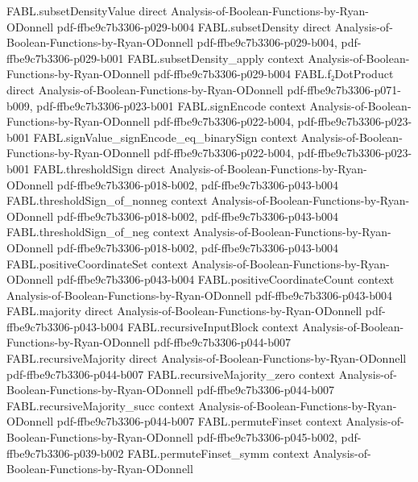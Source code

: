 \begin{theorem}
\proofstep
  {FABL.subsetDensityValue}
  {direct}
  {Analysis-of-Boolean-Functions-by-Ryan-ODonnell}
  {pdf-ffbe9c7b3306-p029-b004}
\proofstep
  {FABL.subsetDensity}
  {direct}
  {Analysis-of-Boolean-Functions-by-Ryan-ODonnell}
  {pdf-ffbe9c7b3306-p029-b004,
    pdf-ffbe9c7b3306-p029-b001}
\proofstep
  {FABL.subsetDensity_apply}
  {context}
  {Analysis-of-Boolean-Functions-by-Ryan-ODonnell}
  {pdf-ffbe9c7b3306-p029-b004}
\proofstep
  {FABL.f₂DotProduct}
  {direct}
  {Analysis-of-Boolean-Functions-by-Ryan-ODonnell}
  {pdf-ffbe9c7b3306-p071-b009,
    pdf-ffbe9c7b3306-p023-b001}
\proofstep
  {FABL.signEncode}
  {context}
  {Analysis-of-Boolean-Functions-by-Ryan-ODonnell}
  {pdf-ffbe9c7b3306-p022-b004,
    pdf-ffbe9c7b3306-p023-b001}
\proofstep
  {FABL.signValue_signEncode_eq_binarySign}
  {context}
  {Analysis-of-Boolean-Functions-by-Ryan-ODonnell}
  {pdf-ffbe9c7b3306-p022-b004,
    pdf-ffbe9c7b3306-p023-b001}
\proofstep
  {FABL.thresholdSign}
  {direct}
  {Analysis-of-Boolean-Functions-by-Ryan-ODonnell}
  {pdf-ffbe9c7b3306-p018-b002,
    pdf-ffbe9c7b3306-p043-b004}
\proofstep
  {FABL.thresholdSign_of_nonneg}
  {context}
  {Analysis-of-Boolean-Functions-by-Ryan-ODonnell}
  {pdf-ffbe9c7b3306-p018-b002,
    pdf-ffbe9c7b3306-p043-b004}
\proofstep
  {FABL.thresholdSign_of_neg}
  {context}
  {Analysis-of-Boolean-Functions-by-Ryan-ODonnell}
  {pdf-ffbe9c7b3306-p018-b002,
    pdf-ffbe9c7b3306-p043-b004}
\proofstep
  {FABL.positiveCoordinateSet}
  {context}
  {Analysis-of-Boolean-Functions-by-Ryan-ODonnell}
  {pdf-ffbe9c7b3306-p043-b004}
\proofstep
  {FABL.positiveCoordinateCount}
  {context}
  {Analysis-of-Boolean-Functions-by-Ryan-ODonnell}
  {pdf-ffbe9c7b3306-p043-b004}
\proofstep
  {FABL.majority}
  {direct}
  {Analysis-of-Boolean-Functions-by-Ryan-ODonnell}
  {pdf-ffbe9c7b3306-p043-b004}
\proofstep
  {FABL.recursiveInputBlock}
  {context}
  {Analysis-of-Boolean-Functions-by-Ryan-ODonnell}
  {pdf-ffbe9c7b3306-p044-b007}
\proofstep
  {FABL.recursiveMajority}
  {direct}
  {Analysis-of-Boolean-Functions-by-Ryan-ODonnell}
  {pdf-ffbe9c7b3306-p044-b007}
\proofstep
  {FABL.recursiveMajority_zero}
  {context}
  {Analysis-of-Boolean-Functions-by-Ryan-ODonnell}
  {pdf-ffbe9c7b3306-p044-b007}
\proofstep
  {FABL.recursiveMajority_succ}
  {context}
  {Analysis-of-Boolean-Functions-by-Ryan-ODonnell}
  {pdf-ffbe9c7b3306-p044-b007}
\proofstep
  {FABL.permuteFinset}
  {context}
  {Analysis-of-Boolean-Functions-by-Ryan-ODonnell}
  {pdf-ffbe9c7b3306-p045-b002,
    pdf-ffbe9c7b3306-p039-b002}
\proofstep
  {FABL.permuteFinset_symm}
  {context}
  {Analysis-of-Boolean-Functions-by-Ryan-ODonnell}

\end{theorem}
